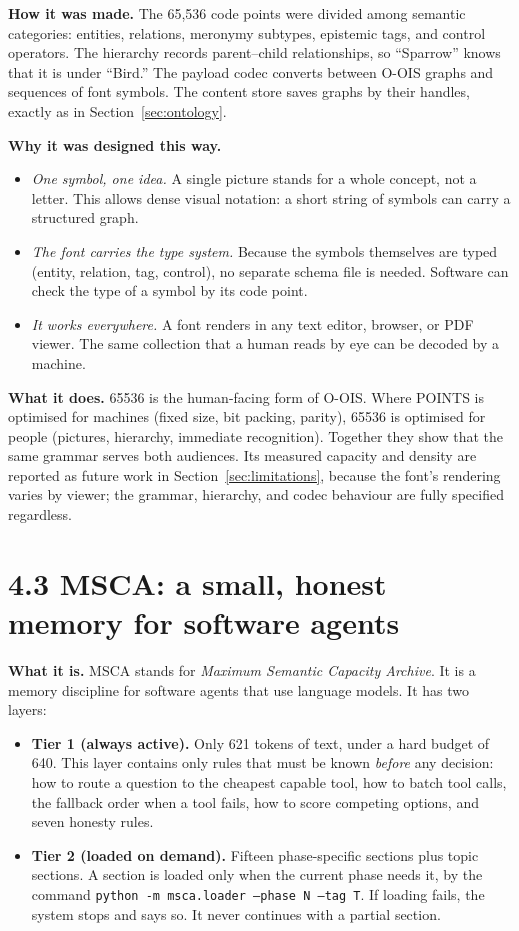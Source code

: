 \textbf{How it was made.} The 65,536 code points were divided among semantic categories: entities, relations, meronymy subtypes, epistemic tags, and control operators. The hierarchy records parent--child relationships, so ``Sparrow'' knows that it is under ``Bird.'' The payload codec converts between O-OIS graphs and sequences of font symbols. The content store saves graphs by their handles, exactly as in Section~\ref{sec:ontology}.

\textbf{Why it was designed this way.}

\begin{itemize}
\item \textit{One symbol, one idea.} A single picture stands for a whole concept, not a letter. This allows dense visual notation: a short string of symbols can carry a structured graph.
\item \textit{The font carries the type system.} Because the symbols themselves are typed (entity, relation, tag, control), no separate schema file is needed. Software can check the type of a symbol by its code point.
\item \textit{It works everywhere.} A font renders in any text editor, browser, or PDF viewer. The same collection that a human reads by eye can be decoded by a machine.
\end{itemize}

\textbf{What it does.} 65536 is the human-facing form of O-OIS. Where POINTS is optimised for machines (fixed size, bit packing, parity), 65536 is optimised for people (pictures, hierarchy, immediate recognition). Together they show that the same grammar serves both audiences. Its measured capacity and density are reported as future work in Section~\ref{sec:limitations}, because the font's rendering varies by viewer; the grammar, hierarchy, and codec behaviour are fully specified regardless.

\section*{4.3 MSCA: a small, honest memory for software agents}

\textbf{What it is.} MSCA stands for \textit{Maximum Semantic Capacity Archive}. It is a memory discipline for software agents that use language models. It has two layers:

\begin{itemize}
\item \textbf{Tier 1 (always active).} Only 621 tokens of text, under a hard budget of 640. This layer contains only rules that must be known \textit{before} any decision: how to route a question to the cheapest capable tool, how to batch tool calls, the fallback order when a tool fails, how to score competing options, and seven honesty rules.
\item \textbf{Tier 2 (loaded on demand).} Fifteen phase-specific sections plus topic sections. A section is loaded only when the current phase needs it, by the command \texttt{python -m msca.loader --phase N --tag T}. If loading fails, the system stops and says so. It never continues with a partial section.
\end{itemize}

